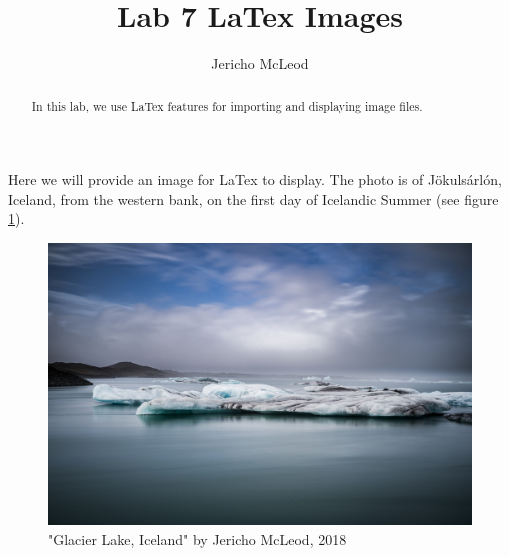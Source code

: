 \documentclass[11pt]{article}
\title{Lab 7 LaTex Images}
\author{Jericho McLeod}
\begin{document}
\maketitle

\begin{abstract}
In this lab, we use LaTex features for importing and displaying image files.
\end{abstract}

\section{}
Here we will provide an image for LaTex to display. The photo is of J\"okuls\'arl\'on, Iceland, from the western bank, on the first day of Icelandic Summer (see figure \ref{fig:glacierlake2018}).
\begin{figure}[h!]
	\centering
	\includegraphics[width=0.7\linewidth]{Glacier_lake_2018}
	\caption{"Glacier Lake, Iceland" by Jericho McLeod, 2018 \textcopyright  }
	\label{fig:glacierlake2018}
\end{figure}
\end{document}
